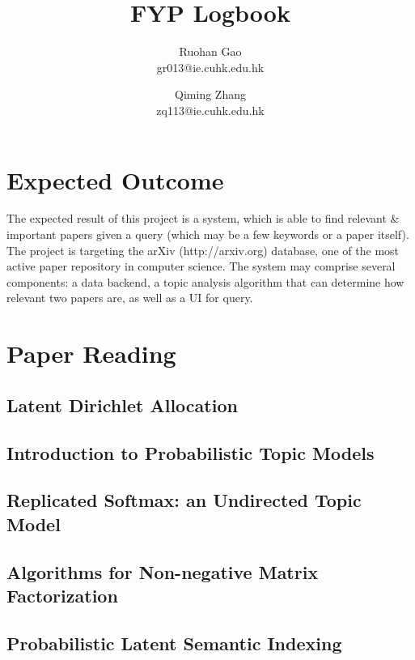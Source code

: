 \documentclass[10pt]{article}
\begin{document}
\title{FYP Logbook}
\author{
		Ruohan Gao \\ gr013@ie.cuhk.edu.hk
		\and
		Qiming Zhang \\ zq113@ie.cuhk.edu.hk
}
\maketitle

\section{Expected Outcome}
The expected result of this project is a system, which is able to find relevant \& important papers given a query (which may be a few keywords or a paper itself). The project is targeting the arXiv (http://arxiv.org) database, one of the most active paper repository in computer science. The system may comprise several components: a data backend, a topic analysis algorithm that can determine how relevant two papers are, as well as a UI for query.

\section{Paper Reading}

\subsection{Latent Dirichlet Allocation \cite{label1}}

\subsection{Introduction to Probabilistic Topic Models \cite{label2}}

\subsection{Replicated Softmax: an Undirected Topic Model \cite{label3}}

\subsection{Algorithms for Non-negative Matrix Factorization \cite{label4}}

\subsection{Probabilistic Latent Semantic Indexing \cite{label5}}
\end{document}
